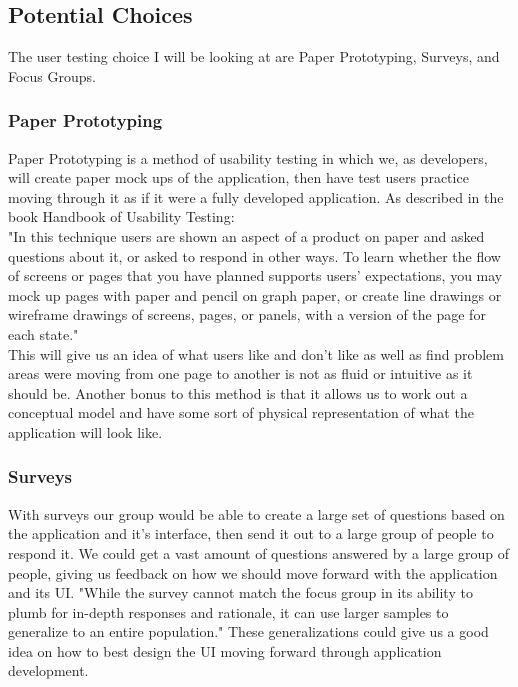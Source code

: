 \documentclass[compsoc, 10, draftclsnofoot, onecolumn]{IEEEtran}
\begin{document}
\subsection{Potential Choices} The user testing choice I will be looking at are Paper Prototyping, Surveys, and Focus Groups. 
\subsubsection{Paper Prototyping} Paper Prototyping is a method of usability testing in which we, as developers, will create paper mock ups of the application, then have test users practice moving through it as if it were a fully developed application. As described in the book Handbook of Usability Testing: \\
"In this technique users are shown an aspect of a product on paper and asked questions about it, or asked to respond in other ways. To learn whether the flow of screens or pages that you have planned supports users’ expectations, you may mock up pages with paper and pencil on graph paper, or create line drawings or wireframe drawings of screens, pages, or panels, with a version of the page for each state\cite{r7}." \\
\indent This will give us an idea of what users like and don't like as well as find problem areas were moving from one page to another is not as fluid or intuitive as it should be. Another bonus to this method is that it allows us to work out a conceptual model and have some sort of physical representation of what the application will look like. 
\subsubsection{Surveys} With surveys our group would be able to create a large set of questions based on the application and it's interface, then send it out to a large group of people to respond it. We could get a vast amount of questions answered by a large group of people, giving us feedback on how we should move forward with the application and its UI. "While the survey cannot match the focus group in its ability to plumb for in-depth responses and rationale, it can use larger samples to generalize to an entire population\cite{r7}." These generalizations could give us a good idea on how to best design the UI moving forward through application development. 
\end{document}
